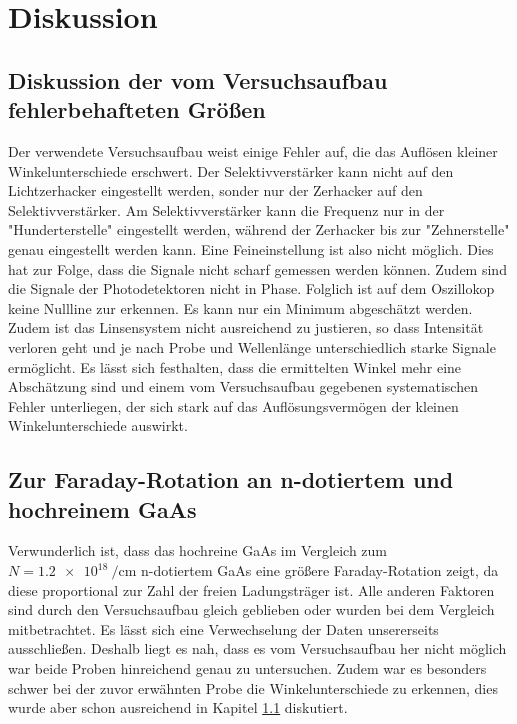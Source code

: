 \section{Diskussion}
\label{sec:Diskussion}
\subsection{Diskussion der vom Versuchsaufbau fehlerbehafteten Größen}
\label{sec:Fehler}
Der verwendete Versuchsaufbau weist einige Fehler auf, die das Auflösen kleiner Winkelunterschiede 
erschwert. Der Selektivverstärker kann nicht auf den Lichtzerhacker eingestellt
werden, sonder nur der Zerhacker auf den Selektivverstärker. Am Selektivverstärker kann die Frequenz nur in der "Hunderterstelle" eingestellt werden, während der Zerhacker bis zur  
"Zehnerstelle" genau eingestellt werden kann. Eine Feineinstellung ist also nicht möglich. 
Dies hat zur Folge, dass die Signale
nicht scharf gemessen werden können. Zudem sind die Signale der
Photodetektoren nicht in Phase. Folglich ist auf dem Oszillokop keine Nullline zur erkennen. Es kann
nur ein Minimum abgeschätzt werden. Zudem ist das Linsensystem nicht ausreichend zu justieren, 
so dass Intensität verloren geht
und je nach Probe und Wellenlänge unterschiedlich starke Signale ermöglicht.
Es lässt sich festhalten, dass die ermittelten Winkel mehr eine Abschätzung sind und einem vom
Versuchsaufbau gegebenen systematischen Fehler unterliegen, der sich stark auf das Auflösungsvermögen
der kleinen Winkelunterschiede auswirkt.

\subsection{Zur Faraday-Rotation an n-dotiertem und hochreinem GaAs}
Verwunderlich ist, dass das hochreine GaAs im Vergleich zum $N= \SI{1.2e18}{\per\centi\meter}$
n-dotiertem GaAs eine größere Faraday-Rotation zeigt, da diese
proportional zur Zahl der freien Ladungsträger ist. Alle anderen Faktoren sind durch den
Versuchsaufbau gleich geblieben oder wurden bei dem Vergleich mitbetrachtet. Es lässt sich eine
Verwechselung der Daten unsererseits ausschließen. Deshalb liegt es nah, dass es vom Versuchsaufbau
her nicht möglich war beide Proben hinreichend genau zu untersuchen. Zudem war es besonders schwer
bei der zuvor erwähnten Probe die Winkelunterschiede zu erkennen, dies wurde aber schon ausreichend in Kapitel \ref{sec:Fehler} diskutiert.

